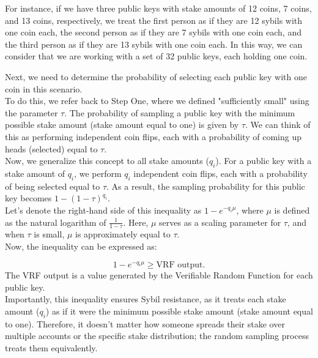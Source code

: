 For instance, if we have three public keys with stake amounts of 12 coins, 7 coins, and 13 coins, respectively, we treat the first person as if they are 12 sybils with one coin each, the second person as if they are 7 sybils with one coin each, and the third person as if they are 13 sybils with one coin each. In this way, we can consider that we are working with a set of 32 public keys, each holding one coin.

Next, we need to determine the probability of selecting each public key with one coin in this scenario.\\
To do this, we refer back to Step One, where we defined "sufficiently small" using the parameter $\tau$. The probability of sampling a public key with the minimum possible stake amount (stake amount equal to one) is given by $\tau$. We can think of this as performing independent coin flips, each with a probability of coming up heads (selected) equal to $\tau$.\\
Now, we generalize this concept to all stake amounts ($q_i$). For a public key with a stake amount of $q_i$, we perform $q_i$ independent coin flips, each with a probability of being selected equal to $\tau$. As a result, the sampling probability for this public key becomes $1 - (1 - \tau)^{q_i}$.\\
Let's denote the right-hand side of this inequality as $1 - e^{-q_i \mu}$, where $\mu$ is defined as the natural logarithm of $\frac{1}{1 - \tau}$. Here, $\mu$ serves as a scaling parameter for $\tau$, and when $\tau$ is small, $\mu$ is approximately equal to $\tau$.\\
Now, the inequality can be expressed as:

$$1 - e^{-q_i \mu} \geq \text{VRF output}.$$
The VRF output is a value generated by the Verifiable Random Function for each public key.\\
Importantly, this inequality ensures Sybil resistance, as it treats each stake amount ($q_i$) as if it were the minimum possible stake amount (stake amount equal to one). Therefore, it doesn't matter how someone spreads their stake over multiple accounts or the specific stake distribution; the random sampling process treats them equivalently.

